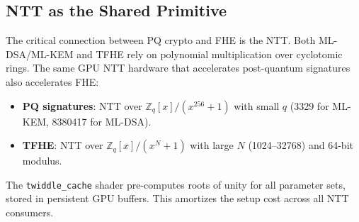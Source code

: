 \subsection{NTT as the Shared Primitive}

The critical connection between PQ crypto and FHE is the NTT. Both ML-DSA/ML-KEM and
TFHE rely on polynomial multiplication over cyclotomic rings. The same GPU NTT hardware
that accelerates post-quantum signatures also accelerates FHE:

\begin{itemize}
\item \textbf{PQ signatures}: NTT over $\mathbb{Z}_q[x]/(x^{256}+1)$ with small $q$
      (3329 for ML-KEM, 8380417 for ML-DSA).
\item \textbf{TFHE}: NTT over $\mathbb{Z}_q[x]/(x^N+1)$ with large $N$ (1024--32768)
      and 64-bit modulus.
\end{itemize}

The \texttt{twiddle\_cache} shader pre-computes roots of unity for all parameter sets,
stored in persistent GPU buffers. This amortizes the setup cost across all NTT consumers.

